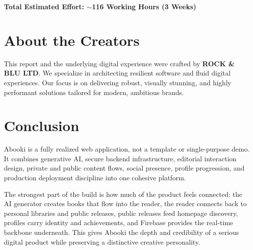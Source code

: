 \documentclass[11pt, a4paper]{article}
\begin{document}
\vspace{0.5cm}
\textbf{Total Estimated Effort: $\sim$116 Working Hours (3 Weeks)}

\section{About the Creators}
This report and the underlying digital experience were crafted by \textbf{ROCK \& BLU LTD}. We specialize in architecting resilient software and fluid digital experiences. Our focus is on delivering robust, visually stunning, and highly performant solutions tailored for modern, ambitious brands.

\section{Conclusion}
Abooki is a fully realized web application, not a template or single-purpose demo. It combines generative AI, secure backend infrastructure, editorial interaction design, private and public content flows, social presence, profile progression, and production deployment discipline into one cohesive platform.

The strongest part of the build is how much of the product feels connected: the AI generator creates books that flow into the reader, the reader connects back to personal libraries and public releases, public releases feed homepage discovery, profiles carry identity and achievements, and Firebase provides the real-time backbone underneath. This gives Abooki the depth and credibility of a serious digital product while preserving a distinctive creative personality.
\end{document}

